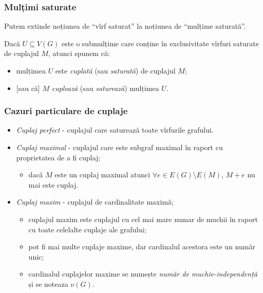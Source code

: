 \begin{frame}
  \frametitle{Mulțimi saturate}

Putem extinde noțiunea de ``vîrf saturat'' la noțiunea de ``mulțime saturată''.\pause

Dacă $U\subseteq V(G)$ este o submulțime care conține în exclusivitate vîrfuri saturate de cuplajul $M$, atunci spunem că:\pause

\begin{itemize}
  \item mulțimea $U$ este \emph{cuplată} (sau \emph{saturată}) de cuplajul $M$;\pause
  \item\mbox{} [sau că] $M$ \emph{cuplează} (sau \emph{saturează}) mulțimea $U$.
\end{itemize}
 

\end{frame}


\begin{frame}
  \frametitle{Cazuri particulare de cuplaje}

\begin{itemize}[<+->]
  \item \emph{Cuplaj perfect} - cuplajul care saturează toate vîrfurile grafului.
  \item \emph{Cuplaj maximal} - cuplajul care este subgraf maximal în raport cu proprietatea de a fi cuplaj;
    \begin{itemize}
      \item dacă $M$ este un cuplaj maximal atunci $\forall e\in E(G)\setminus E(M)$, $M+e$ nu mai este cuplaj. 
    \end{itemize}

  \item \emph{Cuplaj maxim} - cuplajul de cardinalitate maximă;
    \begin{itemize}
      \item cuplajul maxim este cuplajul cu cel mai mare numar de muchii în raport cu toate celelalte cuplaje ale grafului;
      \item pot fi mai multe cuplaje maxime, dar cardinalul acestora este un număr unic;
      \item cardinalul cuplajelor maxime se numește \emph{număr de muchie-independență} și se noteaza $\nu(G)$.
    \end{itemize}
\end{itemize}


\end{frame}


